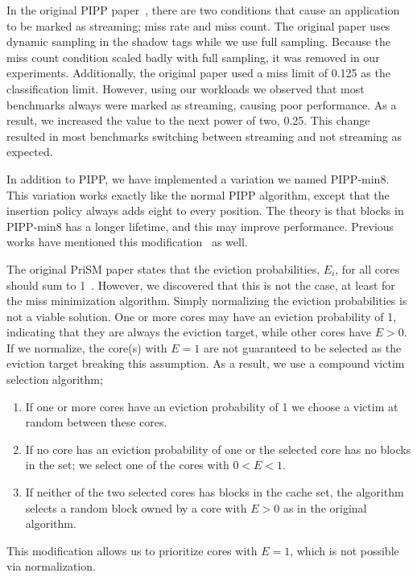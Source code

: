 In the original PIPP paper~\cite{Xie2009}, there are two conditions that cause an application to be marked as streaming; miss rate and miss count.
The original paper uses dynamic sampling in the shadow tags while we use full sampling.
Because the miss count condition scaled badly with full sampling, it was removed in our experiments.
Additionally, the original paper used a miss limit of 0.125 as the classification limit.
However, using our workloads we observed that most benchmarks always were marked as streaming, causing poor performance.
As a result, we increased the value to the next power of two, 0.25.
This change resulted in most benchmarks switching between streaming and not streaming as expected.

In addition to PIPP, we have implemented a variation we named PIPP-min8.
This variation works exactly like the normal PIPP algorithm, except that the insertion policy always adds eight to every position.
The theory is that blocks in PIPP-min8 has a longer lifetime, and this may improve performance.
Previous works have mentioned this modification~\cite{Manikantan2012} as well.

The original PriSM paper states that the eviction probabilities, $E_i$, for all cores should sum to 1~\cite{Manikantan2012}.
However, we discovered that this is not the case, at least for the miss minimization algorithm.
Simply normalizing the eviction probabilities is not a viable solution.
One or more cores may have an eviction probability of 1, indicating that they are always the eviction target, while other cores have $E > 0$.
If we normalize, the core(s) with $E=1$ are not guaranteed to be selected as the eviction target breaking this assumption.
As a result, we use a compound victim selection algorithm;
\begin{enumerate}
\item If one or more cores have an eviction probability of 1 we choose a victim at random between these cores.
\item If no core has an eviction probability of one or the selected core has no blocks in the set; we select one of the cores with $0 < E < 1$.
\item If neither of the two selected cores has blocks in the cache set, the algorithm selects a random block owned by a core with $E > 0$ as in the original algorithm.
\end{enumerate}
This modification allows us to prioritize cores with $E = 1$, which is not possible via normalization.
